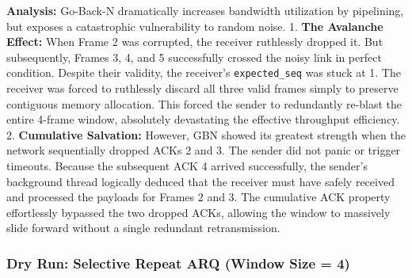 \documentclass[12pt, a4paper]{article}
\begin{document}
\textbf{Analysis:} Go-Back-N dramatically increases bandwidth utilization by pipelining, but exposes a catastrophic vulnerability to random noise. 
1. \textbf{The Avalanche Effect:} When Frame 2 was corrupted, the receiver ruthlessly dropped it. But subsequently, Frames 3, 4, and 5 successfully crossed the noisy link in perfect condition. Despite their validity, the receiver's \texttt{expected\_seq} was stuck at 1. The receiver was forced to ruthlessly discard all three valid frames simply to preserve contiguous memory allocation. This forced the sender to redundantly re-blast the entire 4-frame window, absolutely devastating the effective throughput efficiency.
2. \textbf{Cumulative Salvation:} However, GBN showed its greatest strength when the network sequentially dropped ACKs 2 and 3. The sender did not panic or trigger timeouts. Because the subsequent ACK 4 arrived successfully, the sender's background thread logically deduced that the receiver must have safely received and processed the payloads for Frames 2 and 3. The cumulative ACK property effortlessly bypassed the two dropped ACKs, allowing the window to massively slide forward without a single redundant retransmission.

\subsubsection{Dry Run: Selective Repeat ARQ (Window Size = 4)}
\end{document}
